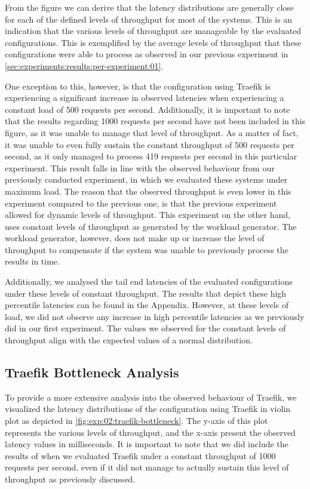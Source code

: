 From the figure we can derive that the latency distributions are generally close for each of the defined levels of throughput for most of the systems. This is an indication that the various levels of throughput are manageable by the evaluated configurations. This is exemplified by the average levels of throughput that these configurations were able to process as observed in our previous experiment in \cref{sec:experiments:results:per-experiment:01}. 

One exception to this, however, is that the configuration using Traefik is experiencing a significant increase in observed latencies when experiencing a constant load of 500 requests per second. Additionally, it is important to note that the results regarding 1000 requests per second have not been included in this figure, as it was unable to manage that level of throughput. As a matter of fact, it was unable to even fully sustain the constant throughput of 500 requests per second, as it only managed to process 419 requests per second in this particular experiment. This result falls in line with the observed behaviour from our previously conducted experiment, in which we evaluated these systems under maximum load. The reason that the observed throughput is even lower in this experiment compared to the previous one, is that the previous experiment allowed for dynamic levels of throughput. This experiment on the other hand, uses constant levels of throughput as generated by the workload generator. The workload generator, however, does not make up or increase the level of throughput to compensate if the system was unable to previously process the results in time. 

Additionally, we analysed the tail end latencies of the evaluated configurations under these levels of constant throughput. The results that depict these high percentile latencies can be found in the Appendix. However, at these levels of load, we did not observe any increase in high percentile latencies as we previously did in our first experiment. The values we observed for the constant levels of throughput align with the expected values of a normal distribution.

\subsection{Traefik Bottleneck Analysis}
\label{sec:experiments:results:per-experiment:02:traefik-bottleneck}

To provide a more extensive analysis into the observed behaviour of Traefik, we visualized the latency distributions of the configuration using Traefik in violin plot as depicted in \cref{fig:exp:02:traefik-bottleneck}. The y-axis of this plot represents the various levels of throughput, and the x-axis present the observed latency values in milliseconds. It is important to note that we did include the results of when we evaluated Traefik under a constant throughput of 1000 requests per second, even if it did not manage to actually sustain this level of throughput as previously discussed. 

